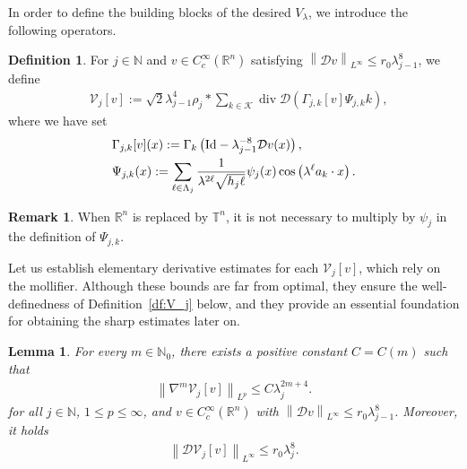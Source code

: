 \documentclass[a4paper,12pt,reqno]{amsart}
\theoremstyle{plain}
\newtheorem{lemm}[thm]{Lemma}
\theoremstyle{definition}
\newtheorem{df}[thm]{Definition}
\newtheorem{rem}[thm]{Remark}
\renewcommand{\div}{\operatorname{div}}
\renewcommand{\leq}{\leqslant}
\newcommand{\n}[1]{{\left\|#1\right\|}}
\newcommand{\Id}{{\rm Id}}
\newcommand{\R}{\mathbb{R}}
\newcommand{\T}{\mathbb{T}}
\newcommand{\N}{\mathbb{N}}
\renewcommand{\sp}[1]{\left(#1\right)}
\begin{document}
In order to define the building blocks of the desired $V_{\lambda}$, we introduce the following operators.
\begin{df}
    For $j \in \N$ and $v \in C_c^{\infty}(\R^n)$ satisfying $\n{\mathcal{D}v}_{L^\infty} \leq r_0 \lambda_{j-1}^{8}$, we define 
    \begin{align}
        &
        {\mathcal{V}}_j[v]
        :=
        \sqrt{2}
        \lambda_{j-1}^4
        \rho_j*
        \sum_{k \in \mathcal{K}}
        \div \mathcal{D}
        \sp{{\Gamma}_{j,k}[v]
        {\Psi}_{j,k}
        k},
    \end{align}
    where we have set 
    \begin{align}
        &{\Gamma}_{j,k}[v](x):=\Gamma_k\sp{\Id-\lambda_{j-1}^{-8}\mathcal{D}v(x)},
        \\
        &
        {\Psi}_{j,k}(x)
        :=
        \sum_{\ell\in \Lambda_j}
        \frac{1}{\lambda^{2\ell}\sqrt{h_j\ell}}
        \psi_{j}(x)
        \cos \sp{\lambda^{\ell}
        a_k \cdot x}.
    \end{align}
\end{df}
\begin{rem}\label{rem:V}
    When $\R^n$ is replaced by $\T^n$, 
    it is not necessary to multiply by $\psi_j$ in the definition of $\Psi_{j,k}$.
\end{rem}
Let us establish elementary derivative estimates for each $\mathcal{V}_j[v]$, which rely on the mollifier.
Although these bounds are far from optimal, they ensure the well-definedness of Definition~\ref{df:V_j} below,
and they provide an essential foundation for obtaining the sharp estimates later on.
\begin{lemm}\label{lemm:V[v]}
    For every $m \in \N_0$, 
    there exists a positive constant $C=C(m)$ such that 
    \begin{align}\label{est:V[v]-1}
        \n{\nabla^m{\mathcal{V}}_j[v]}_{L^{p}}
        \leq 
        C
        \lambda_j^{2m+4}.
    \end{align}
    for all $j \in \N$,  $1 \leq p \leq \infty$, and $v \in C_c^{\infty}(\R^n)$ with $\n{\mathcal{D}v}_{L^\infty} \leq r_0 \lambda_{j-1}^{8}$.
    Moreover, it holds
    \begin{align}\label{est:V[v]-2}
        \n{\mathcal{D}{\mathcal{V}}_j[v]}_{L^{\infty}}
        \leq 
        r_0\lambda_{j}^{8}.
    \end{align}
\end{lemm}
\end{document}
